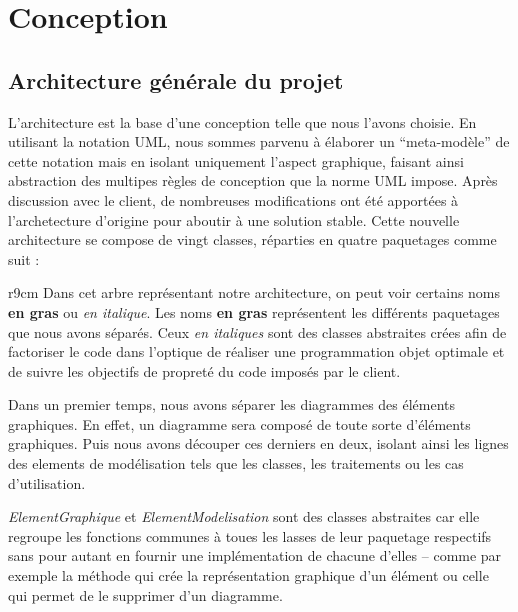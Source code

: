 \documentclass[12pt,a4paper,openany]{report}
\begin{document}
	\chapter{Conception}
	\section{Architecture générale du projet}
		L'architecture est la base d'une conception telle que nous l'avons choisie. En utilisant la notation UML, 
		nous sommes parvenu à élaborer un ``meta-modèle'' de cette notation mais en isolant uniquement l'aspect 
		graphique, faisant ainsi abstraction des multipes règles de conception que la norme UML impose. Après 
		discussion avec le client, de nombreuses modifications ont été apportées à l'archetecture d'origine 
		pour aboutir à une solution stable. Cette nouvelle architecture se compose de vingt classes, réparties 
		en quatre paquetages comme suit :
	\newline
	\begin{wrapfigure}{r}{9cm}
		Dans cet arbre représentant notre architecture, on peut voir certains noms \textbf{en gras} ou \textit{en italique}. 
		Les noms \textbf{en gras} représentent les différents paquetages que nous avons séparés. Ceux \textit{en italiques} 
		sont des classes abstraites crées afin de factoriser le code dans l'optique de réaliser une programmation objet optimale 
		et de suivre les objectifs de propreté du code imposés par le client.\vspace{2px}
		
		Dans un premier temps, nous avons séparer les diagrammes des éléments graphiques. En effet, un diagramme sera composé de
		toute sorte d'éléments graphiques. Puis nous avons découper ces derniers en deux, isolant ainsi les lignes des elements
		de modélisation tels que les classes, les traitements ou les cas d'utilisation.\vspace{2px}
		
		\textit{ElementGraphique} et \textit{ElementModelisation} sont des classes abstraites car elle regroupe les fonctions communes
		à toues les lasses de leur paquetage respectifs sans pour autant en fournir une implémentation de chacune d'elles -- comme par exemple la méthode qui crée la
		représentation graphique d'un élément ou celle qui permet de le supprimer d'un diagramme.
	\end{wrapfigure}
\end{document}
